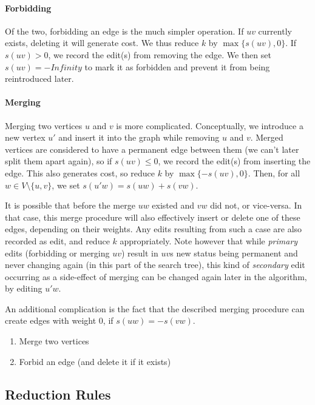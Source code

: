 \documentclass{article}
\theoremstyle{definition}
\begin{document}
\paragraph{Forbidding} Of the two, forbidding an edge is the much simpler operation. If $uv$
currently exists, deleting it will generate cost. We thus reduce $k$ by $\max\{s(uv), 0\}$. If $s(uv)
> 0$, we record the edit(s) from removing the edge. We then set $s(uv) = -Infinity$ to mark it as
forbidden and prevent it from being reintroduced later.

\paragraph{Merging} Merging two vertices $u$ and $v$ is more complicated. Conceptually, we introduce
a new vertex $u'$ and insert it into the graph while removing $u$ and $v$. Merged vertices are
considered to have a permanent edge between them (we can't later split them apart again), so if
$s(uv) \leq 0$, we record the edit(s) from inserting the edge. This also generates cost, so reduce
$k$ by $\max\{-s(uv), 0\}$. Then, for all $w \in V \setminus \{u, v\}$, we set $s(u'w) = s(uw) +
s(vw)$.

It is possible that before the merge $uw$ existed and $vw$ did not, or vice-versa. In that case,
this merge procedure will also effectively insert or delete one of these edges, depending on their
weights. Any edits resulting from such a case are also recorded as edit, and reduce $k$
appropriately. Note however that while \emph{primary} edits (forbidding or merging $uv$) result in
$uv$s new status being permanent and never changing again (in this part of the search tree), this
kind of \emph{secondary} edit occurring as a side-effect of merging can be changed again later in
the algorithm, by editing $u'w$.

An additional complication is the fact that the described merging procedure can create edges with
weight 0, if $s(uw) = -s(vw)$.

\begin{enumerate}
	\item Merge two vertices
	\item Forbid an edge (and delete it if it exists)
\end{enumerate}

\subsection{Reduction Rules}
\end{document}

